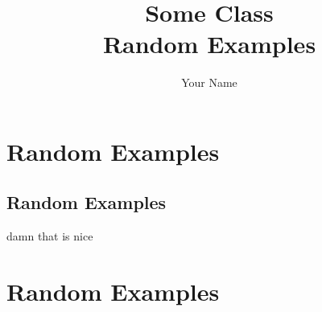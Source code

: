 \documentclass[12pt,a4paper]{report}
\title{\Huge{Some Class}\\Random Examples}
\author{\huge{Your Name}}
\date{}
\begin{document}
\newpage%
\tableofcontents{}
\pagebreak

\section{Random Examples}
\subsection{Random Examples}
damn that is nice
\section{Random Examples}
\end{document}
